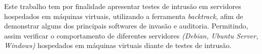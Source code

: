 Este trabalho tem por finalidade apresentar testes de intrusão em servidores hospedados em máquinas virtuais, utilizando a ferramenta \emph{backtrack}, afim de demonstrar alguns dos principais softwares de invasão e auditoria. Permitindo, assim verificar o comportamento de diferentes servidores \emph{(Debian, Ubuntu Server, Windows)}  hospedados em máquinas virtuais diante de testes de intrusão.